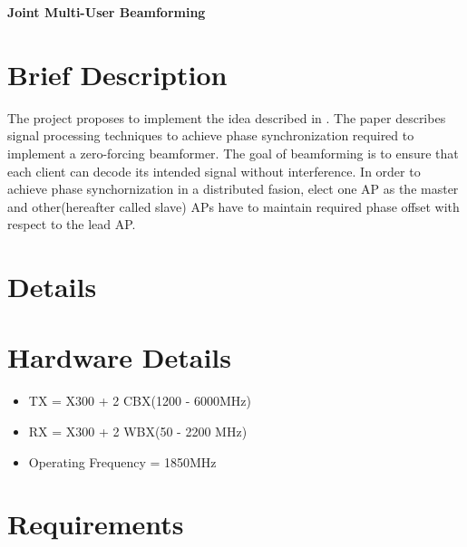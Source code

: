 \documentclass[]{dks-report}
\begin{document}
\begin{center}
  \huge{\textbf{Joint Multi-User Beamforming}}
\end{center}

\section{Brief Description}
The project proposes to implement the idea described in \cite{Rahul2012_JMB}.
The paper describes signal processing techniques to achieve phase
synchronization required to implement a zero-forcing beamformer.
The goal of beamforming is to ensure that each client can decode its intended
signal without interference. In order to achieve phase synchornization in a
distributed fasion, elect
one AP as the master and other(hereafter called slave) APs have to maintain 
required phase offset with respect to the lead AP.

\section{Details}

\section{Hardware Details}
\begin{itemize}
  \item TX = X300 + 2 CBX(1200 - 6000MHz)
  \item RX = X300 + 2 WBX(50 - 2200 MHz)
  \item Operating Frequency = 1850MHz
\end{itemize}

\section{Requirements}



\end{document}
